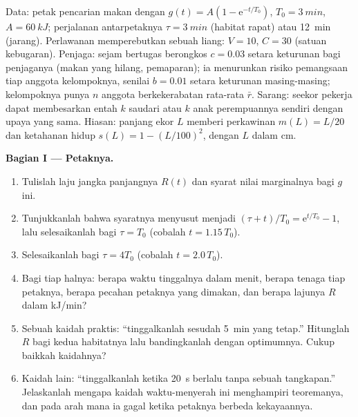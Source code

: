 \begin{problem}
\label{pb:b3:behavioural-ecology:1}
Data: petak pencarian makan dengan $g(t) = A(1 - \mathrm{e}^{-t/T_{0}})$, $T_{0}
= \qty{3}{min}$, $A = \qty{60}{kJ}$; perjalanan antarpetaknya $\tau =
\qty{3}{min}$ (habitat rapat) atau \qty{12}{min} (jarang). Perlawanan memperebutkan
sebuah liang: $V = 10$, $C = 30$ (satuan kebugaran). Penjaga: sejam bertugas
berongkos $c = 0.03$ setara keturunan bagi penjaganya (makan yang hilang,
pemaparan); ia menurunkan risiko pemangsaan tiap anggota kelompoknya, senilai $b = 0.01$
setara keturunan masing-masing; kelompoknya punya $n$ anggota berkekerabatan rata-rata $\bar r$. Sarang: seekor
pekerja dapat membesarkan entah $k$ saudari atau $k$
anak perempuannya sendiri dengan upaya yang sama. Hiasan: panjang ekor $L$ memberi
perkawinan $m(L) = L/20$ dan ketahanan hidup $s(L) = 1 - (L/100)^{2}$, dengan $L$ dalam cm.

\medskip
\noindent\textbf{Bagian I --- Petaknya.}
\begin{enumerate}
  \item Tulislah laju jangka panjangnya $R(t)$ dan syarat nilai marginalnya
        bagi $g$ ini.
  \item Tunjukkanlah bahwa syaratnya menyusut menjadi $(\tau + t)/T_{0} = \mathrm{e}^{t/T_{0}}
        - 1$, lalu selesaikanlah bagi $\tau = T_{0}$ (cobalah $t = 1.15\,T_{0}$).
  \item Selesaikanlah bagi $\tau = 4T_{0}$ (cobalah $t = 2.0\,T_{0}$).
  \item Bagi tiap halnya: berapa waktu tinggalnya dalam menit, berapa tenaga tiap petaknya,
        berapa pecahan petaknya yang dimakan, dan berapa lajunya $R$ dalam kJ/min?
  \item Sebuah kaidah praktis: ``tinggalkanlah sesudah \qty{5}{min} yang tetap.'' Hitunglah
        $R$ bagi kedua habitatnya lalu bandingkanlah dengan optimumnya. Cukup baikkah
        kaidahnya?
  \item Kaidah lain: ``tinggalkanlah ketika \qty{20}{s} berlalu tanpa sebuah
        tangkapan.'' Jelaskanlah mengapa kaidah waktu-menyerah ini menghampiri
        teoremanya, dan pada arah mana ia gagal ketika petaknya berbeda
        kekayaannya.
\end{enumerate}


\end{problem}
